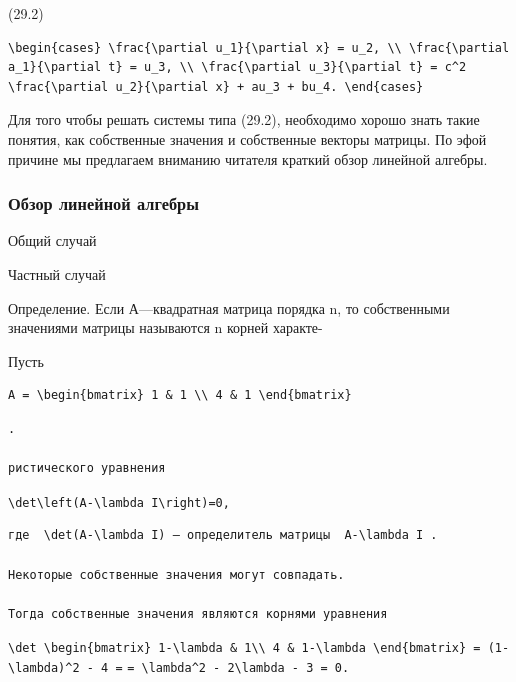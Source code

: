 \documentclass[
  ukrainian,
]{article}
\begin{document}
(29.2)

\begin{verbatim}
\begin{cases} \frac{\partial u_1}{\partial x} = u_2, \\ \frac{\partial a_1}{\partial t} = u_3, \\ \frac{\partial u_3}{\partial t} = c^2 \frac{\partial u_2}{\partial x} + au_3 + bu_4. \end{cases}
\end{verbatim}

Для того чтобы решать системы типа (29.2), необходимо хорошо знать такие
понятия, как собственные значения и собственные векторы матрицы. По эфой
причине мы предлагаем вниманию читателя краткий обзор линейной алгебры.

\subsubsection{Обзор линейной
алгебры}\label{ux43eux431ux437ux43eux440-ux43bux438ux43dux435ux439ux43dux43eux439-ux430ux43bux433ux435ux431ux440ux44b}

Общий случай

Частный случай

Определение. Если А---квадратная матрица порядка n, то собственными
значениями матрицы называются n корней характе-

Пусть

\begin{verbatim}
A = \begin{bmatrix} 1 & 1 \\ 4 & 1 \end{bmatrix}
\end{verbatim}

\begin{verbatim}
.

ристического уравнения
\end{verbatim}

\texttt{\textbackslash{}det\textbackslash{}left(A-\textbackslash{}lambda\ I\textbackslash{}right)=0,}

\begin{verbatim}
где  \det(A-\lambda I) — определитель матрицы  A-\lambda I .

Некоторые собственные значения могут совпадать.

Тогда собственные значения являются корнями уравнения
\end{verbatim}

\texttt{\textbackslash{}det\ \textbackslash{}begin\{bmatrix\}\ 1-\textbackslash{}lambda\ \&\ 1\textbackslash{}\textbackslash{}\ 4\ \&\ 1-\textbackslash{}lambda\ \textbackslash{}end\{bmatrix\}\ =\ (1-\textbackslash{}lambda)\^{}2\ -\ 4\ =}
\texttt{=\ \textbackslash{}lambda\^{}2\ -\ 2\textbackslash{}lambda\ -\ 3\ =\ 0.}
\end{document}
